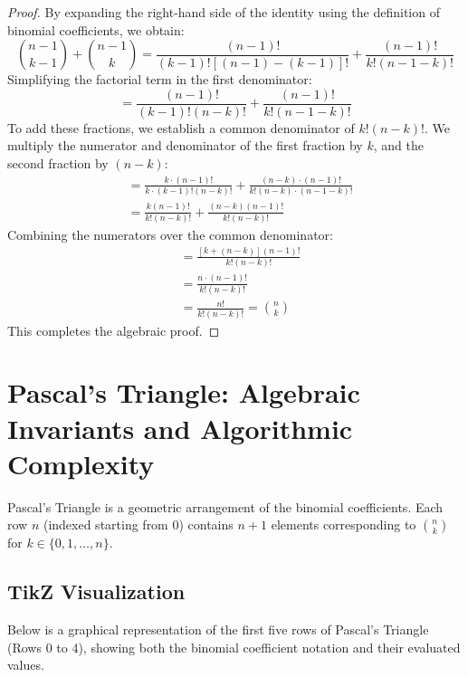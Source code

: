 \documentclass[10pt,journal,compsoc,onecolumn]{IEEEtran}
\begin{document}
\begin{proof}
By expanding the right-hand side of the identity using the definition of binomial coefficients, we obtain:
\begin{equation}
\binom{n - 1}{k - 1} + \binom{n - 1}{k} = \frac{(n - 1)!}{(k - 1)! \left[ (n - 1) - (k - 1) \right]!} + \frac{(n - 1)!}{k! (n - 1 - k)!}
\end{equation}
Simplifying the factorial term in the first denominator:
\begin{equation}
= \frac{(n - 1)!}{(k - 1)! (n - k)!} + \frac{(n - 1)!}{k! (n - 1 - k)!}
\end{equation}
To add these fractions, we establish a common denominator of $k! (n - k)!$. We multiply the numerator and denominator of the first fraction by $k$, and the second fraction by $(n - k)$:
\begin{align}
&= \frac{k \cdot (n - 1)!}{k \cdot (k - 1)! (n - k)!} + \frac{(n - k) \cdot (n - 1)!}{k! (n - k) \cdot (n - 1 - k)!} \\
&= \frac{k(n - 1)!}{k!(n - k)!} + \frac{(n - k)(n - 1)!}{k!(n - k)!}
\end{align}
Combining the numerators over the common denominator:
\begin{align}
&= \frac{[k + (n - k)] (n - 1)!}{k! (n - k)!} \\
&= \frac{n \cdot (n - 1)!}{k! (n - k)!} \\
&= \frac{n!}{k! (n - k)!} = \binom{n}{k}
\end{align}
This completes the algebraic proof.
\end{proof}

\section{Pascal's Triangle: Algebraic Invariants and Algorithmic Complexity}
\label{sec:pascal}

Pascal's Triangle is a geometric arrangement of the binomial coefficients. Each row $n$ (indexed starting from $0$) contains $n+1$ elements corresponding to $\binom{n}{k}$ for $k \in \{0, 1, \ldots, n\}$.

\subsection{TikZ Visualization}

Below is a graphical representation of the first five rows of Pascal's Triangle (Rows 0 to 4), showing both the binomial coefficient notation and their evaluated values.
\end{document}
